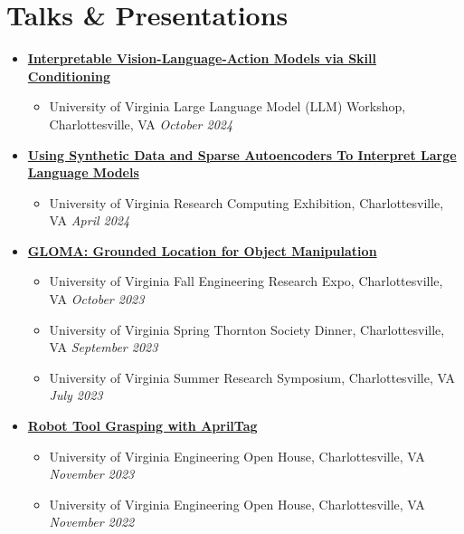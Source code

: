 \documentclass[letterpaper,11pt]{article}
\newcommand{\Date}[1]{\textit{\small #1}}
\begin{document}
\section{Talks \& Presentations}
\begin{itemize}
  \item {\href{https://www.brandonyifanyang.com/skillvla.pdf}{\textbf{Interpretable Vision-Language-Action Models via Skill Conditioning}}}
        \begin{itemize}
          \item University of Virginia Large Language Model (LLM) Workshop, Charlottesville, VA \hfill \Date{October 2024}
        \end{itemize}
  \item {\href{https://www.brandonyifanyang.com/MI.pdf}{\textbf{Using Synthetic Data and Sparse Autoencoders To Interpret Large Language Models}}}
        \begin{itemize}
          \item University of Virginia Research Computing Exhibition, Charlottesville, VA \hfill \Date{April 2024}
        \end{itemize}
  \item \href{https://www.brandonyifanyang.com/gloma.pdf}{\textbf{GLOMA: Grounded Location for Object Manipulation}}
        \begin{itemize}
          \item University of Virginia Fall Engineering Research Expo, Charlottesville, VA \hfill \Date{October 2023}
          \item University of Virginia Spring Thornton Society Dinner, Charlottesville, VA \hfill \Date{September 2023}
          \item University of Virginia Summer Research Symposium, Charlottesville, VA \hfill \Date{July 2023}
        \end{itemize}
  \item \href{https://github.com/branyang02/apriltag_detection}{\textbf{Robot Tool Grasping with AprilTag}}
        \begin{itemize}
          \item University of Virginia Engineering Open House, Charlottesville, VA \hfill \Date{November 2023}
          \item University of Virginia Engineering Open House, Charlottesville, VA \hfill \Date{November 2022}
        \end{itemize}
\end{itemize}
\end{document}
